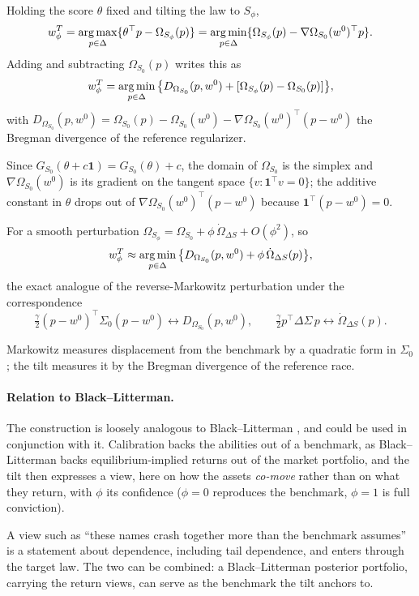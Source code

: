 Holding the score $\theta$ fixed
and tilting the law to $S_\phi$,
\[
  w^T_\phi = \operatorname*{arg\,max}_{p\in\Delta}\{\theta^\top p - \Omega_{S_\phi}(p)\}
  = \operatorname*{arg\,min}_{p\in\Delta}\{\Omega_{S_\phi}(p) - \nabla\Omega_{S_0}(w^0)^\top p\}.
\]
Adding and subtracting $\Omega_{S_0}(p)$ writes this as
\[
  w^T_\phi = \operatorname*{arg\,min}_{p\in\Delta}\big\{ D_{\Omega_{S_0}}(p, w^0)
  + [\Omega_{S_\phi}(p) - \Omega_{S_0}(p)] \big\},
\]
with $D_{\Omega_{S_0}}(p,w^0) = \Omega_{S_0}(p) - \Omega_{S_0}(w^0)
- \nabla\Omega_{S_0}(w^0)^\top(p-w^0)$ the Bregman divergence of the reference
regularizer.

Since $G_{S_0}(\theta + c\mathbf 1) = G_{S_0}(\theta) + c$, the domain
of $\Omega_{S_0}$ is the simplex and $\nabla\Omega_{S_0}(w^0)$ is its gradient on
the tangent space $\{v : \mathbf 1^\top v = 0\}$; the additive constant in
$\theta$ drops out of $\nabla\Omega_{S_0}(w^0)^\top(p - w^0)$ because
$\mathbf 1^\top(p - w^0) = 0$.

For a smooth perturbation $\Omega_{S_\phi} = \Omega_{S_0}
+ \phi\,\dot\Omega_{\Delta S} + O(\phi^2)$, so
\[
  w^T_\phi \approx \operatorname*{arg\,min}_{p\in\Delta}\big\{ D_{\Omega_{S_0}}(p, w^0)
  + \phi\,\dot\Omega_{\Delta S}(p) \big\},
\]
the exact analogue of the reverse-Markowitz perturbation under the correspondence
\[
  \tfrac{\gamma}{2}(p-w^0)^\top\Sigma_0(p-w^0) \leftrightarrow D_{\Omega_{S_0}}(p,w^0),
  \qquad
  \tfrac{\gamma}{2}p^\top\Delta\Sigma\,p \leftrightarrow \dot\Omega_{\Delta S}(p).
\]

Markowitz measures displacement from the benchmark by a quadratic form in
$\Sigma_0$; the tilt measures it by the Bregman divergence of the reference race.

\paragraph{Relation to Black--Litterman.}
The construction is loosely analogous to Black--Litterman \parencite{black1992},
and could be used in conjunction with it.
Calibration backs the abilities out of a
benchmark, as Black--Litterman backs equilibrium-implied returns out of the market
portfolio, and the tilt then expresses a view, here on how the assets
\emph{co-move} rather than on what they return, with $\phi$ its confidence
($\phi = 0$ reproduces the benchmark, $\phi = 1$ is full conviction).

A view such as
``these names crash together more than the benchmark assumes'' is a statement
about dependence, including tail dependence, and enters through the target law.
The two can be combined: a Black--Litterman posterior portfolio, carrying the
return views, can serve as the benchmark the tilt anchors to.

